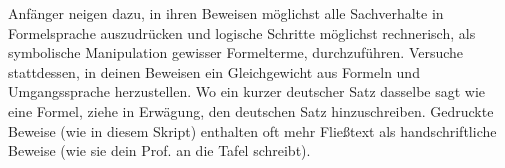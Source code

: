 \begin{bem}
    Anfänger neigen dazu, in ihren Beweisen möglichst alle Sachverhalte in Formelsprache auszudrücken und logische Schritte möglichst rechnerisch, als symbolische Manipulation gewisser Formelterme, durchzuführen. Versuche stattdessen, in deinen Beweisen ein Gleichgewicht aus Formeln und Umgangssprache herzustellen. Wo ein kurzer deutscher Satz dasselbe sagt wie eine Formel, ziehe in Erwägung, den deutschen Satz hinzuschreiben. Gedruckte Beweise (wie in diesem Skript) enthalten oft mehr Fließtext als handschriftliche Beweise (wie sie dein Prof. an die Tafel schreibt).
\end{bem}

